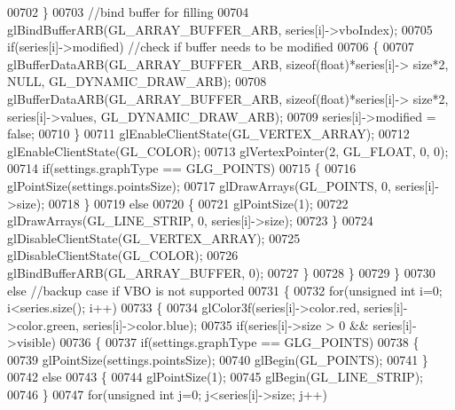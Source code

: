 \begin{DoxyCode}
{{{{{{{{00702                 \}
00703                 \textcolor{comment}{//bind buffer for filling}
00704                 glBindBufferARB(GL_ARRAY_BUFFER_ARB, series[i]->vboIndex);
00705                 \textcolor{keywordflow}{if}(series[i]->modified) \textcolor{comment}{//check if buffer needs to be modified}
00706                 \{
00707                     glBufferDataARB(GL_ARRAY_BUFFER_ARB, \textcolor{keyword}{sizeof}(\textcolor{keywordtype}{float})*series[i]->
      size*2, NULL, GL_DYNAMIC_DRAW_ARB);
00708                     glBufferDataARB(GL_ARRAY_BUFFER_ARB, \textcolor{keyword}{sizeof}(\textcolor{keywordtype}{float})*series[i]->
      size*2, series[i]->values, GL_DYNAMIC_DRAW_ARB);
00709                     series[i]->modified = \textcolor{keyword}{false};
00710                 \}
00711                 glEnableClientState(GL_VERTEX_ARRAY);
00712                 glEnableClientState(GL_COLOR);
00713                 glVertexPointer(2, GL_FLOAT, 0, 0);
00714                 \textcolor{keywordflow}{if}(settings.graphType == GLG_POINTS)
00715                 \{
00716                     glPointSize(settings.pointsSize);
00717                     glDrawArrays(GL_POINTS, 0, series[i]->size);
00718                 \}
00719                 \textcolor{keywordflow}{else}
00720                 \{
00721                     glPointSize(1);
00722                     glDrawArrays(GL_LINE_STRIP, 0, series[i]->size);
00723                 \}
00724                 glDisableClientState(GL_VERTEX_ARRAY);
00725                 glDisableClientState(GL_COLOR);
00726                 glBindBufferARB(GL_ARRAY_BUFFER, 0);
00727             \}
00728         \}
00729     \}
00730     \textcolor{keywordflow}{else}  \textcolor{comment}{//backup case if VBO is not supported}
00731     \{
00732         \textcolor{keywordflow}{for}(\textcolor{keywordtype}{unsigned} \textcolor{keywordtype}{int} i=0; i<series.size(); i++)
00733         \{
00734             glColor3f(series[i]->color.red, series[i]->color.green, series[i]->color.blue);
00735             \textcolor{keywordflow}{if}(series[i]->size > 0 && series[i]->visible)
00736             \{
00737                 \textcolor{keywordflow}{if}(settings.graphType == GLG_POINTS)
00738                 \{
00739                     glPointSize(settings.pointsSize);
00740                     glBegin(GL_POINTS);
00741                 \}
00742                 \textcolor{keywordflow}{else}
00743                 \{
00744                     glPointSize(1);
00745                     glBegin(GL_LINE_STRIP);
00746                 \}
00747                 \textcolor{keywordflow}{for}(\textcolor{keywordtype}{unsigned} \textcolor{keywordtype}{int} j=0; j<series[i]->size; j++)
}}}}}}}}
\end{DoxyCode}
